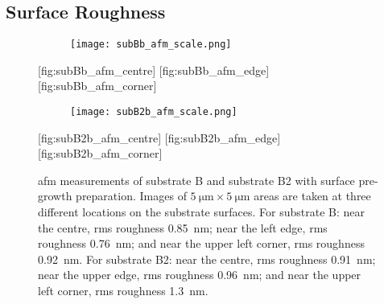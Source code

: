 \subsection{Surface Roughness}

\begin{figure}[htbp]
    \centering
    \begin{subfigure}[c]{0.032\linewidth}
        \label{fig:subBb_afm_scale}\captionsetup{list=no}
        \texttt{[image: subBb\_afm\_scale.png]}
    \end{subfigure}
    \hfill
    [fig:subBb_afm_centre]%
    \hfill
    [fig:subBb_afm_edge]%
    \hfill
    [fig:subBb_afm_corner] %
    \par\bigskip
    \begin{subfigure}[c]{0.032\linewidth}
        \label{fig:subB2b_afm_scale}\captionsetup{list=no}
        \texttt{[image: subB2b\_afm\_scale.png]}
    \end{subfigure}
    \hfill
    [fig:subB2b_afm_centre]
    \hfill
    [fig:subB2b_afm_edge]
    \hfill
    [fig:subB2b_afm_corner]
    \caption[\Ac{afm} of substrate B and substrate B2 with surface pre-growth preparation.]{\Ac{afm} measurements of substrate B and substrate B2 with surface pre-growth preparation. Images of $\SI{5}{\micro\metre}\times\SI{5}{\micro\metre}$ areas are taken at three different locations on the substrate surfaces. For substrate B:  near the centre, \ac{rms} roughness \SI{0.85}{\nano\metre};  near the left edge, \ac{rms} roughness \SI{0.76}{\nano\metre}; and  near the upper left corner, \ac{rms} roughness \SI{0.92}{\nano\metre}. For substrate B2:  near the centre, \ac{rms} roughness \SI{0.91}{\nano\metre};  near the upper edge, \ac{rms} roughness \SI{0.96}{\nano\metre}; and  near the upper left corner, \ac{rms} roughness \SI{1.3}{\nano\metre}.}\label{fig:subBb_and_subB2_afm}
\end{figure} %

